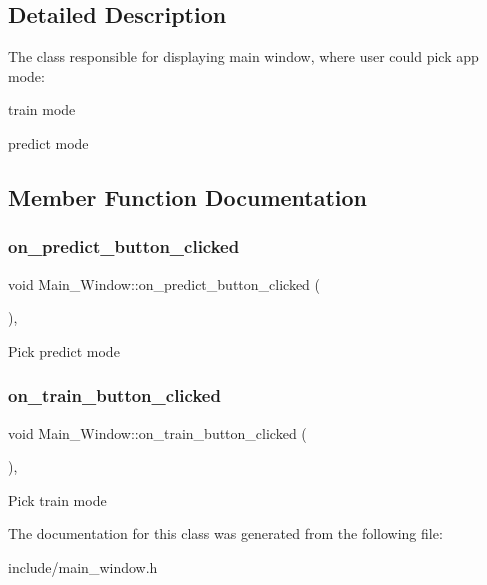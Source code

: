 \subsection{Detailed Description}
The class responsible for displaying main window, where user could pick app mode\+: 


\begin{DoxyItemize}
\item train mode
\item predict mode 
\end{DoxyItemize}

\subsection{Member Function Documentation}
\mbox{\label{class_main___window_a152cfc3e430cff4fb23f07ef43afaeb5}} 
\subsubsection{\texorpdfstring{on\+\_\+predict\+\_\+button\+\_\+clicked}{on\_predict\_button\_clicked}}
{\footnotesize\ttfamily void Main\+\_\+\+Window\+::on\+\_\+predict\+\_\+button\+\_\+clicked (\begin{DoxyParamCaption}{ }\end{DoxyParamCaption})\hspace{0.3cm}{\ttfamily [private]}, {\ttfamily [slot]}}

Pick predict mode \mbox{\label{class_main___window_a4081b8f068e82535e5a0f00924221c21}} 
\subsubsection{\texorpdfstring{on\+\_\+train\+\_\+button\+\_\+clicked}{on\_train\_button\_clicked}}
{\footnotesize\ttfamily void Main\+\_\+\+Window\+::on\+\_\+train\+\_\+button\+\_\+clicked (\begin{DoxyParamCaption}{ }\end{DoxyParamCaption})\hspace{0.3cm}{\ttfamily [private]}, {\ttfamily [slot]}}

Pick train mode 

The documentation for this class was generated from the following file\+:\begin{DoxyCompactItemize}
\item 
include/main\+\_\+window.\+h\end{DoxyCompactItemize}
